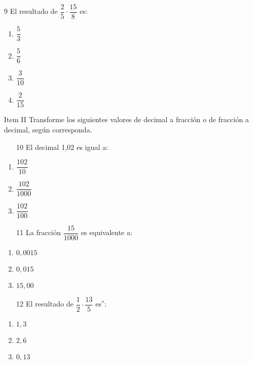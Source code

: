 \documentclass[12pt]{article}
\begin{document}
\begin{enumerate}
	\item [9]El resultado de $\dfrac{2}{5} \cdot \dfrac{15}{8}$	es:
	\begin{enumerate}
		\item $\dfrac{5}{3}$\\
		\item $\dfrac{5}{6}$\\
		\item $\dfrac{3}{10}$\\
		\item $\dfrac{2}{15}$\\
	\end{enumerate}
\item [Item II] Transforme los siguientes valores de decimal a fracción o de fracción a decimal, según corresponda. 
\begin{multicols}{2}
	\begin{enumerate}
		\item [10] El decimal 1,02 es igual a:
	\end{enumerate}
		\begin{enumerate}
			\item $\dfrac{102}{10}$\\
			\item $\dfrac{102}{1000}$\\
			\item $\dfrac{102}{100}$\\
			\end{enumerate}

	\begin{enumerate}
		\item [11]La fracción $\dfrac{15}{1000}$	 es equivalente a:
			\end{enumerate}
		\begin{enumerate}
			\item $0,0015$\\
			\item $0,015$\\
			\item $15,00$\\
	\end{enumerate}
\end{multicols}

	\begin{enumerate}
		\item [12]El resultado de $\dfrac{1}{2} \cdot \dfrac{13}{5}$  es$^\ast$: 		\\
			\end{enumerate}
		\begin{enumerate}
			\item $1,3$\\
			\item $2,6$\\
			\item $0,13$\\
			

\end{enumerate}
\end{enumerate}
\end{document}
